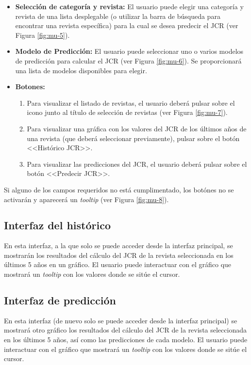 \begin{itemize} 
\item \textbf{Selección de categoría y revista:} El usuario puede elegir una categoría y revista de una lista desplegable (o utilizar la barra de búsqueda para encontrar una revista específica) para la cual se desea predecir el JCR (ver Figura \ref{fig:mu-5}).
\item \textbf{Modelo de Predicción:} El usuario puede seleccionar uno o varios modelos de predicción para calcular el JCR (ver Figura \ref{fig:mu-6}). Se proporcionará una lista de modelos disponibles para elegir.
\item \textbf{Botones:} 
\begin{enumerate}
    \item Para visualizar el listado de revistas, el usuario deberá pulsar sobre el icono junto al título de selección de revistas (ver Figura \ref{fig:mu-7}).
    \item Para visualizar una gráfica con los valores del JCR de los últimos años de una revista (que deberá seleccionar previamente), pulsar sobre el botón <<Histórico JCR>>.
    \item Para visualizar las predicciones del JCR, el usuario deberá pulsar sobre el botón <<Predecir JCR>>.
\end{enumerate}
\end{itemize}

Si alguno de los campos requeridos no está cumplimentado, los botónes no se activarán y aparecerá un \textit{tooltip} (ver Figura \ref{fig:mu-8}).



\subsection{Interfaz del histórico}
En esta interfaz, a la que solo se puede acceder desde la interfaz principal, se mostrarán los resultados del cálculo del JCR de la revista seleccionada en los últimos 5 años en un gráfico.  El usuario puede interactuar con el gráfico que mostrará un \textit{tooltip} con los valores donde se sitúe el cursor.


\subsection{Interfaz de predicción}
En esta interfaz (de nuevo solo se puede acceder desde la interfaz principal) se mostrará otro gráfico los resultados del cálculo del JCR de la revista seleccionada en los últimos 5 años, así como las predicciones de cada modelo. El usuario puede interactuar con el gráfico que mostrará un \textit{tooltip} con los valores donde se sitúe el cursor.

